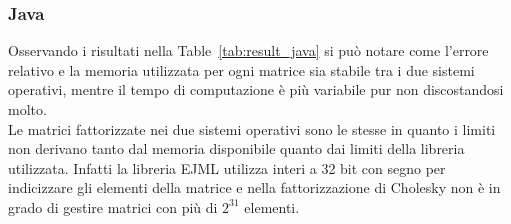 \documentclass[a4paper, 12pt]{article}
\begin{document}
            \subsubsection{Java}
                Osservando i risultati nella Table~\ref{tab:result_java} si può notare come l'errore relativo e la 
                memoria utilizzata per ogni matrice sia stabile tra i due sistemi operativi, mentre il tempo di 
                computazione è più variabile pur non discostandosi molto.\\
                Le matrici fattorizzate nei due sistemi operativi sono le stesse in quanto i limiti non derivano tanto
                dal memoria disponibile quanto dai limiti della libreria utilizzata. Infatti la libreria EJML utilizza
                interi a 32 bit con segno per indicizzare gli elementi della matrice e nella fattorizzazione di Cholesky
                non è in grado di gestire matrici con più di $2^{31}$ elementi.
                \begin{table}[h]
                    \centering
                    \caption{Risultati dei benchmark Java}
                    \label{tab:result_java}
                \end{table}
\end{document}
